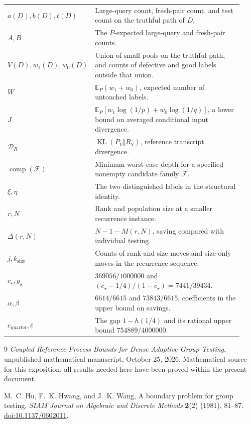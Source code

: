 \documentclass[11pt]{article}
\theoremstyle{definition}
\theoremstyle{remark}
\newcommand{\E}{\mathbb E}
\newcommand{\KL}{\operatorname{KL}}
\newcommand{\Comp}{\operatorname{comp}}
\newcommand{\cstar}{c_\star}
\newcommand{\er}{e_{\mathrm{quarter}}}
\numberwithin{equation}{section}
\begin{document}
\begin{longtable}{p{0.23\linewidth}p{0.70\linewidth}}
\(a(D),b(D),t(D)\)&Large-query count, fresh-pair count, and test count
on the truthful path of \(D\).\\
\(A,B\)&The \(P\)-expected large-query and fresh-pair counts.\\
\(V(D),w_1(D),w_0(D)\)&Union of small pools on the truthful path, and
counts of defective and good labels outside that union.\\
\(W\)&\(\E_P(w_1+w_0)\), expected number of untouched labels.\\
\(J\)&\(\E_P[w_1\log(1/p)+w_0\log(1/q)]\), a lower bound on averaged
conditional input divergence.\\
\(\mathcal D_R\)&\(\KL(P_Y\Vert R_Y)\), reference transcript divergence.\\
\(\Comp(\mathcal F)\)&Minimum worst-case depth for a specified nonempty
candidate family \(\mathcal F\).\\
\(\xi,\eta\)&The two distinguished labels in the structural identity.\\
\(r,N\)&Rank and population size at a smaller recurrence instance.\\
\(\Delta(r,N)\)&\(N-1-M(r,N)\), saving compared with individual testing.\\
\(j,k_{\mathrm{size}}\)&Counts of rank-and-size moves and size-only moves
in the recurrence sequence.\\
\(\cstar,g_\star\)&\(369056/1000000\) and
\((\cstar-1/4)/(1-\cstar)=7441/39434\).\\
\(\alpha,\beta\)&\(6614/6615\) and \(73843/6615\), coefficients in the
upper bound on savings.\\
\(\er,\bar e\)&The gap \(1-h(1/4)\) and its rational upper bound
\(754889/4000000\).\\
\end{longtable}

\begin{thebibliography}{9}
\emph{Coupled Reference-Process Bounds for Dense Adaptive Group Testing},
unpublished mathematical manuscript, October 25, 2026.
Mathematical source for this exposition; all results needed here
have been proved within the present document.

M.~C. Hu, F.~K. Hwang, and J.~K. Wang,
A boundary problem for group testing,
\emph{SIAM Journal on Algebraic and Discrete Methods}
\textbf{2}(2) (1981), 81--87.
\href{https://doi.org/10.1137/0602011}{doi:10.1137/0602011}.
\end{thebibliography}
\end{document}

